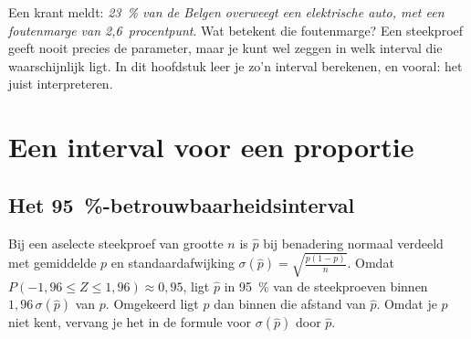 %



Een krant meldt: \textit{23~\% van de Belgen overweegt een elektrische auto, met een foutenmarge van 2,6~procentpunt}. Wat betekent die foutenmarge? Een steekproef geeft nooit precies de parameter, maar je kunt wel zeggen in welk interval die waarschijnlijk ligt. In dit hoofdstuk leer je zo'n interval berekenen, en vooral: het juist interpreteren.

\begin{oefeningen}[Start]

\end{oefeningen}

\section{Een interval voor een proportie}

\subsection{Het 95~\%-betrouwbaarheidsinterval}

Bij een aselecte steekproef van grootte $n$ is $\hat{p}$ bij benadering normaal verdeeld met gemiddelde $p$ en standaardafwijking $\sigma(\hat{p}) = \sqrt{\frac{p(1 - p)}{n}}$. Omdat $P(-1{,}96 \leqslant Z \leqslant 1{,}96) \approx 0{,}95$, ligt $\hat{p}$ in 95~\% van de steekproeven binnen $1{,}96\,\sigma(\hat{p})$ van $p$. Omgekeerd ligt $p$ dan binnen die afstand van $\hat{p}$. Omdat je $p$ niet kent, vervang je het in de formule voor $\sigma(\hat{p})$ door $\hat{p}$.

